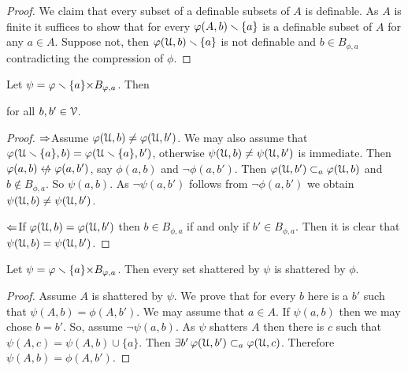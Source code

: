 \documentclass[sputnik.tex]{subfiles}
\begin{document}
\begin{proof}
We claim that every subset of a definable subsets of $A$ is definable. As $A$ is finite it suffices to show that for every $\varphi(A,b)\smallsetminus\{a\}$ is a definable subset of $A$ for any $a\in A$. Suppose not, then  $\varphi(\EuScript U,b)\smallsetminus\{a\}$ is not definable and $b\in B_{\phi,a}$ contradicting the compression of $\phi$.
\end{proof}


\begin{proposition}\label{prop_conservative} Let $\psi=\varphi\smallsetminus\{a\}{\times}B_{\varphi,a}$.
Then

\hfill for all $b,b'\in\EuScript V$.
\end{proposition}

\begin{proof}
$\Rightarrow$\quad Assume $\varphi(\EuScript U,b)\neq\varphi(\EuScript U,b')$.
We may also assume that $\varphi(\EuScript U\smallsetminus\{a\},b)=\varphi(\EuScript U\smallsetminus\{a\},b')$, otherwise $\psi(\EuScript U,b)\neq\psi(\EuScript U,b')$ is immediate.
Then $\phi(a,b)\niff\phi(a,b')$, say $ \phi(a,b)$ and $\neg \phi(a,b')$.
Then $\varphi(\EuScript U,b')\subset_a\varphi(\EuScript U,b)$ and $b\notin B_{\phi,a}$.
So $\psi(a,b)$. 
As $\neg \psi(a,b')$ follows from $\neg \phi(a,b')$ we obtain $\psi(\EuScript U,b)\neq\psi(\EuScript U,b')$.

$\Leftarrow$\quad If $\varphi(\EuScript U,b)=\varphi(\EuScript U,b')$ then $b\in B_{\phi,a}$ if and only if $b'\in B_{\phi,a}$.
Then it is clear that $\psi(\EuScript U,b)=\psi(\EuScript U,b')$.
\end{proof}


\begin{proposition}\label{prop_shattered} 
Let $\psi=\varphi\smallsetminus\{a\}{\times}B_{\varphi,a}$.
Then every set shattered by $\psi$ is shattered by $\phi$.
\end{proposition}

\begin{proof}
Assume $A$ is shattered by $\psi$.
We prove that for every $b$ here is a $b'$ such that $\psi(A,b)=\phi(A,b')$.
We may assume that $a\in A$.
If $\psi(a,b)$ then we may chose $b=b'$.
So, assume $\neg\psi(a,b)$.
As $\psi$ shatters $A$ then there is $c$ such that $\psi(A,c)=\psi(A,b)\cup\{a\}$.
Then $\exists b'\,\varphi(\EuScript U,b')\subset_a\varphi(\EuScript U,c)$.
Therefore $\psi(A,b)=\phi(A,b')$.
\end{proof}
\end{document}
